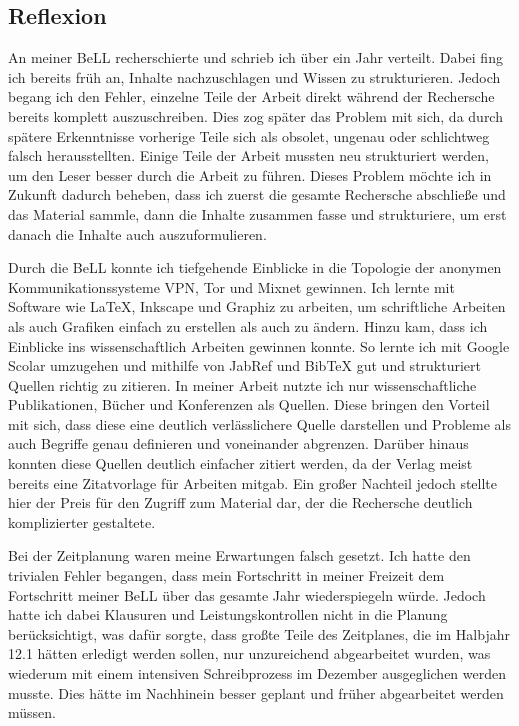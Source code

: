 \subsection{Reflexion}

An meiner BeLL recherschierte und schrieb ich über ein Jahr verteilt. Dabei fing ich bereits früh an, Inhalte nachzuschlagen und Wissen zu strukturieren. Jedoch begang ich den Fehler, einzelne Teile der Arbeit direkt während der Rechersche bereits komplett auszuschreiben. Dies zog später das Problem mit sich, da durch spätere Erkenntnisse vorherige Teile sich als obsolet, ungenau oder schlichtweg falsch herausstellten. Einige Teile der Arbeit mussten neu strukturiert werden, um den Leser besser durch die Arbeit zu führen. Dieses Problem möchte ich in Zukunft dadurch beheben, dass ich zuerst die gesamte Rechersche abschließe und das Material sammle, dann die Inhalte zusammen fasse und strukturiere, um erst danach die Inhalte auch auszuformulieren.

Durch die BeLL konnte ich tiefgehende Einblicke in die Topologie der anonymen Kommunikationssysteme VPN, Tor und Mixnet gewinnen.
Ich lernte mit Software wie LaTeX, Inkscape und Graphiz zu arbeiten, um schriftliche Arbeiten als auch Grafiken einfach zu erstellen als auch zu ändern. Hinzu kam, dass ich Einblicke ins wissenschaftlich Arbeiten gewinnen konnte. So lernte ich mit Google Scolar umzugehen und mithilfe von JabRef und BibTeX gut und strukturiert Quellen richtig zu zitieren.
In meiner Arbeit nutzte ich nur wissenschaftliche Publikationen, Bücher und Konferenzen als Quellen. Diese bringen den Vorteil mit sich, dass diese eine deutlich verlässlichere Quelle darstellen und Probleme als auch Begriffe genau definieren und voneinander abgrenzen. Darüber hinaus konnten diese Quellen deutlich einfacher zitiert werden, da der Verlag meist bereits eine Zitatvorlage für Arbeiten mitgab. Ein großer Nachteil jedoch stellte hier der Preis für den Zugriff zum Material dar, der die Rechersche deutlich komplizierter gestaltete.

Bei der Zeitplanung waren meine Erwartungen falsch gesetzt. Ich hatte den trivialen Fehler begangen, dass mein Fortschritt in meiner Freizeit dem Fortschritt meiner BeLL über das gesamte Jahr wiederspiegeln würde. Jedoch hatte ich dabei Klausuren und Leistungskontrollen nicht in die Planung berücksichtigt, was dafür sorgte, dass großte Teile des Zeitplanes, die im Halbjahr 12.1 hätten erledigt werden sollen, nur unzureichend abgearbeitet wurden, was wiederum mit einem intensiven Schreibprozess im Dezember ausgeglichen werden musste. Dies hätte im Nachhinein besser geplant und früher abgearbeitet werden müssen.
